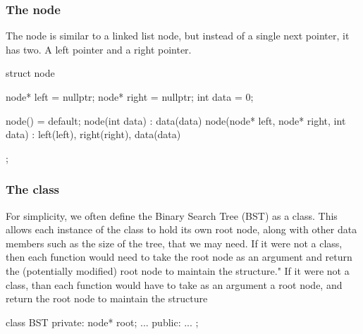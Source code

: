 \documentclass{report}
\begin{document}
\subsubsection{The node}
\bigbreak \noindent 
The node is similar to a linked list node, but instead of a single next pointer, it has two. A left pointer and a right pointer.
\bigbreak \noindent 
\begin{cppcode}
    struct node{
        node* left = nullptr;
        node* right = nullptr;
        int data = 0;

        node() = default;
        node(int data) : data(data) {}
        node(node* left, node* right, int data) : left(left), right(right), data(data) {}
    };
\end{cppcode}

\bigbreak \noindent 
\subsubsection{The class}
\bigbreak \noindent 
For simplicity, we often define the Binary Search Tree (BST) as a class. This allows each instance of the class to hold its own root node, along with other data members such as the size of the tree, that we may need. \bigbreak \noindent If it were not a class, then each function would need to take the root node as an argument and return the (potentially modified) root node to maintain the structure."
\bigbreak \noindent 
If it were not a class, than each function would have to take as an argument a root node, and return the root node to maintain the structure
\bigbreak \noindent 
\begin{cppcode}
    class BST {
    private:
        node* root;
        ...
    public:
        ...
    };
\end{cppcode}

\pagebreak 
\end{document}
